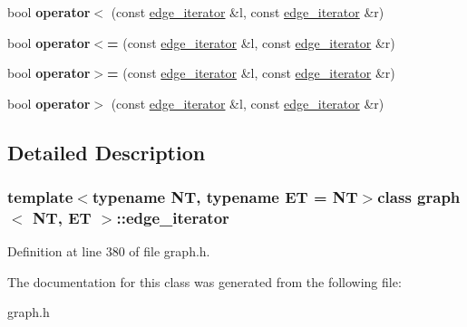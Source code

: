 \begin{DoxyCompactItemize}
\item 
\hypertarget{classgraph_1_1edge__iterator_a23a3dd85c962c0c5a4bf0b30e7696576}{bool {\bfseries operator$<$} (const \hyperlink{classgraph_1_1edge__iterator}{edge\+\_\+iterator} \&l, const \hyperlink{classgraph_1_1edge__iterator}{edge\+\_\+iterator} \&r)}\label{classgraph_1_1edge__iterator_a23a3dd85c962c0c5a4bf0b30e7696576}

\item 
\hypertarget{classgraph_1_1edge__iterator_a301c07a77180ec86202103484fdfc7eb}{bool {\bfseries operator$<$=} (const \hyperlink{classgraph_1_1edge__iterator}{edge\+\_\+iterator} \&l, const \hyperlink{classgraph_1_1edge__iterator}{edge\+\_\+iterator} \&r)}\label{classgraph_1_1edge__iterator_a301c07a77180ec86202103484fdfc7eb}

\item 
\hypertarget{classgraph_1_1edge__iterator_abd25c6fb3a8cc28addbb46e9775ce14c}{bool {\bfseries operator$>$=} (const \hyperlink{classgraph_1_1edge__iterator}{edge\+\_\+iterator} \&l, const \hyperlink{classgraph_1_1edge__iterator}{edge\+\_\+iterator} \&r)}\label{classgraph_1_1edge__iterator_abd25c6fb3a8cc28addbb46e9775ce14c}

\item 
\hypertarget{classgraph_1_1edge__iterator_afb0a71f83c2fbd013fd42f6a91fdbc99}{bool {\bfseries operator$>$} (const \hyperlink{classgraph_1_1edge__iterator}{edge\+\_\+iterator} \&l, const \hyperlink{classgraph_1_1edge__iterator}{edge\+\_\+iterator} \&r)}\label{classgraph_1_1edge__iterator_afb0a71f83c2fbd013fd42f6a91fdbc99}

\end{DoxyCompactItemize}


\subsection{Detailed Description}
\subsubsection*{template$<$typename N\+T, typename E\+T = N\+T$>$class graph$<$ N\+T, E\+T $>$\+::edge\+\_\+iterator}



Definition at line 380 of file graph.\+h.



The documentation for this class was generated from the following file\+:\begin{DoxyCompactItemize}
\item 
graph.\+h\end{DoxyCompactItemize}
